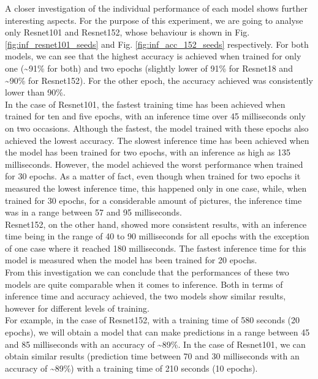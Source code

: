 A closer investigation of the individual performance of each model shows further interesting aspects. For the purpose of this experiment, we are going to analyse only Resnet101 and Resnet152, whose behaviour is shown in Fig. \ref{fig:inf_resnet101_seeds} and Fig. \ref{fig:inf_acc_152_seeds} respectively. For both models, we can see that the highest accuracy is achieved when trained for only one (\textasciitilde91\% for both) and two epochs (slightly lower of 91\% for Resnet18 and \textasciitilde90\% for Resnet152). For the other epoch, the accuracy achieved was consistently lower than 90\%. \\
In the case of Resnet101, the fastest training time has been achieved when trained for ten and five epochs, with an inference time over 45 milliseconds only on two occasions. Although the fastest, the model trained with these epochs also achieved the lowest accuracy. The slowest inference time has been achieved when the model has been trained for two epochs, with an inference as high as 135 milliseconds. However, the model achieved the worst performance when trained for 30 epochs. As a matter of fact, even though when trained for two epochs it measured the lowest inference time, this happened only in one case, while, when trained for 30 epochs, for a considerable amount of pictures, the inference time was in a range between 57 and 95 milliseconds. \\
Resnet152, on the other hand, showed more consistent results, with an inference time being in the range of 40 to 90 milliseconds for all epochs with the exception of one case where it reached 180 milliseconds. The fastest inference time for this model is measured when the model has been trained for 20 epochs.\\
From this investigation we can conclude that the performances of these two models are quite comparable when it comes to inference. Both in terms of inference time and accuracy achieved, the two models show similar results, however for different levels of training. \\
For example, in the case of Resnet152, with a training time of 580 seconds (20 epochs), we will obtain a model that can make predictions in a range between 45 and 85 milliseconds with an accuracy of \textasciitilde89\%. In the case of Resnet101, we can obtain similar results (prediction time between 70 and 30 milliseconds with an accuracy of \textasciitilde89\%) with a training time of 210 seconds (10 epochs). \\

